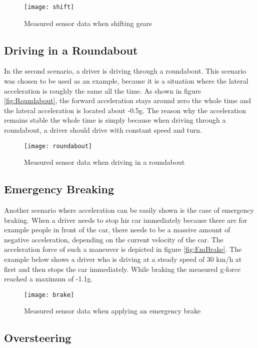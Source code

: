 \begin{figure}[H]
    \centering
    \texttt{[image: shift]}
    \caption{Measured sensor data when shifting gears}
    \label{fig:ShiftGears}
\end{figure}

\subsection{Driving in a Roundabout}
In the second scenario, a driver is driving through a roundabout. This scenario was chosen to be used as an example, because it is a situation where the lateral acceleration is roughly the same all the time. As shown in figure \vref{fig:Roundabout}, the forward acceleration stays around zero the whole time and the lateral acceleration is located about -0.5g. The reason why the acceleration remains stable the whole time is simply because when driving through a roundabout, a driver should drive with constant speed and turn.

\begin{figure}[H]
    \centering
    \texttt{[image: roundabout]}
    \caption{Measured sensor data when driving in a roundabout}
    \label{fig:Roundabout}
\end{figure}

\subsection{Emergency Breaking}
Another scenario where acceleration can be easily shown is the case of emergency braking. When a driver needs to stop his car immediately because there are for example people in front of the car, there needs to be a massive amount of negative acceleration, depending on the current velocity of the car. The acceleration force of such a maneuver is depicted in figure \vref{fig:EmBrake}. The example below shows a driver who is driving at a steady speed of 30 km/h at first and then stops the car immediately. While braking the measured g-force reached a maximum of -1.1g.


\begin{figure}[H]
    \centering
    \texttt{[image: brake]}
    \caption{Measured sensor data when applying an emergency brake}
    \label{fig:EmBrake}
\end{figure}

\subsection{Oversteering}

